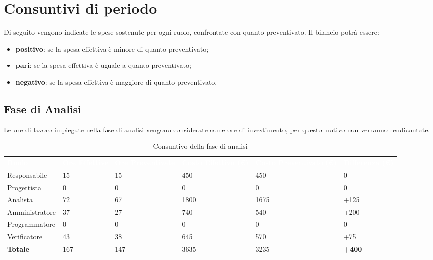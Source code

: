 \section{Consuntivi di periodo}
Di seguito vengono indicate le spese sostenute per ogni ruolo, confrontate con quanto preventivato. Il bilancio potrà essere:
\begin{itemize}
\item \textbf{positivo}: se la spesa effettiva è minore di quanto preventivato;
\item \textbf{pari}: se la spesa effettiva è uguale a quanto preventivato;
\item \textbf{negativo}: se la spesa effettiva è maggiore di quanto preventivato.
\end{itemize}

\subsection{Fase di Analisi}
Le ore di lavoro impiegate nella fase di analisi vengono considerate come ore di investimento; per questo motivo non verranno rendicontate.

\begin{table}[H]
\begin{center}
\renewcommand{\arraystretch}{1.5}
\begin{tabular}{ m{}<{\centering}  m{}<{\centering} m{}<{\centering} m{}<{\centering} m{}<{\centering} m{}<{\centering}}	\rowcolor{darkblue}
	\textcolor{white}{\textbf{Ruolo}} & \textcolor{white}{\textbf{Ore Effettive}} & \textcolor{white}{\textbf{Ore Preventivate}} & \textcolor{white}{\textbf{Costo Effettivo (\euro)}} & \textcolor{white}{\textbf{Costo Preventivato (\euro)}}&\textcolor{white}{\textbf{Differenza (\euro)}}\\ 

	Responsabile  & 15 & 15 & 450 & 450 & 0\\	
	
	Progettista & 0 & 0 & 0 & 0 & 0\\
	
	Analista & 72 & 67 & 1800 & 1675 & +125\\
	
	Amministratore & 37 & 27 & 740 & 540 & +200\\
	
	Programmatore & 0 & 0 &0 &0 & 0\\
	
	Verificatore & 43 & 38 & 645 & 570 & +75\\
	
	\textbf{Totale} & 167 & 147 & 3635 & 3235 & \textbf{+400} \\
	
\end{tabular}
\caption{Consuntivo della fase di analisi}
\end{center}
\end{table}

